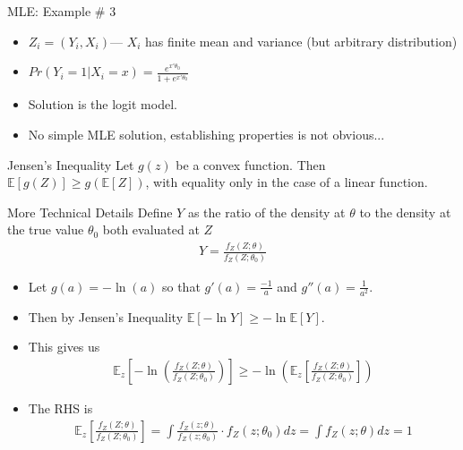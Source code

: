 \documentclass[aspectratio=169]{beamer}
\begin{document}
\begin{frame}{MLE: Example \# 3}
\begin{itemize}
\item $Z_i = (Y_i, X_i)$---   $X_i$ has finite mean and variance (but arbitrary distribution)
\item $Pr(Y_i=1 | X_i =x) =  \frac{e^{x' \theta_0}}{1+ e^{x'\theta_0}}$
\item Solution is the \alert{logit} model.
\item No simple MLE solution, establishing properties is not obvious...
\end{itemize}
\end{frame}

\begin{frame}{Jensen's Inequality}
Let $g(z)$ be a convex function. Then $\mathbb { E }[g(Z)] \geq g(\mathbb { E }[Z])$, with equality only in the case of a linear function.
\end{frame}

\begin{frame}{More Technical Details}
Define $Y$ as the ratio of the density at $\theta$ to the density at the true value $\theta_0$ both evaluated at $Z$
\begin{align*}
Y = \frac{f_Z(Z;\theta)}{f_Z(Z;\theta_0)}
\end{align*}
\begin{itemize}
\item Let $g(a) = -\ln(a)$ so that $g'(a) = \frac{-1}{a}$ and $g''(a) =\frac{1}{a^2}$.
\item Then by \alert{Jensen's Inequality} $\mathbb{E}[- \ln Y] \geq - \ln \mathbb{E}[Y]$.
\item This gives us
\begin{align*}
\mathbb { E }_z \left[ - \ln \left( \frac { f _ { Z } ( Z ; \theta ) } { f _ { Z } \left( Z ; \theta _ { 0 } \right) } \right) \right] \geq - \ln \left( \mathbb { E }_z \left[ \frac { f _ { Z } ( Z ; \theta ) } { f _ { Z } \left( Z ; \theta _ { 0 } \right) } \right] \right)
\end{align*}
\item The RHS is
\begin{align*}
\mathbb { E }_z \left[ \frac { f _ { Z } ( Z ; \theta ) } { f _ { Z } \left( Z ; \theta _ { 0 } \right) } \right] = \int \frac { f _ { Z } ( z ; \theta ) } { f _ { Z } \left( z ; \theta _ { 0 } \right) } \cdot f _ { Z } \left( z ; \theta _ { 0 } \right) d z = \int f _ { Z } ( z ; \theta ) d z = 1
\end{align*}
\end{itemize}
\end{frame}
\end{document}
